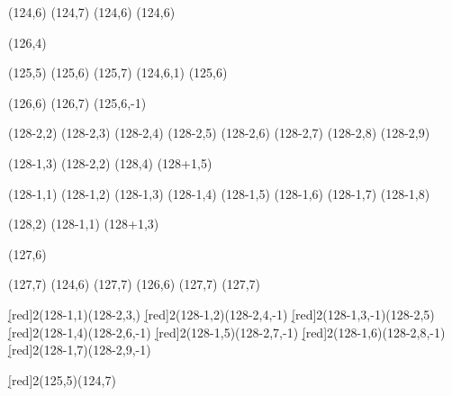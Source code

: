 \begin{sseqdata}[ name = theta6ASS, xscale=1.0, yscale=1.0, x range = {123}{127}, y range = {0}{7}, x tick step = 2, y tick step = 2, class labels = {left}, classes = fill, grid = crossword, Adams grading, lax degree]

  \class["x_{6,94}"](124,6)
  \class(124,7) \structline
  \class(124,6)
  \class(124,6) 

  \class["D_3(1)"](126,4)

  \class["K_0"](125,5)
  \class(125,6) \structline
  \class(125,7) \structline \structline(124,6,1)
  \class["h_6H_1"](125,6)
  
  \class(126,6)
  \class(126,7) \structline(125,6,-1)

  
  \class["h_6^2"](128-2,2)
  \class(128-2,3) \structline
  \class(128-2,4) \structline
  \class(128-2,5) \structline
  \class(128-2,6) \structline
  \class(128-2,7) \structline
  \class(128-2,8) \structline
  \class(128-2,9) \structline

  \class(128-1,3) \structline(128-2,2)
  \class(128,4) \structline
  \class(128+1,5) \structline 
  
  \class["h_{7}"](128-1,1)
  \class(128-1,2) \structline
  \class(128-1,3) \structline
  \class(128-1,4) \structline
  \class(128-1,5) \structline
  \class(128-1,6) \structline
  \class(128-1,7) \structline
  \class(128-1,8) \structline
  
  \class(128,2) \structline(128-1,1)
  \class(128+1,3) \structline

  \class(127,6)

  \class(127,7) \structline(124,6)
  \class(127,7) \structline(126,6)
  \class(127,7)
  \class(127,7)
  
  
  
  \d[red]2(128-1,1)(128-2,3,)
  \d[red]2(128-1,2)(128-2,4,-1)
  \d[red]2(128-1,3,-1)(128-2,5)
  \d[red]2(128-1,4)(128-2,6,-1)
  \d[red]2(128-1,5)(128-2,7,-1)
  \d[red]2(128-1,6)(128-2,8,-1)
  \d[red]2(128-1,7)(128-2,9,-1)

  \d[red]2(125,5)(124,7)
  
\end{sseqdata}



